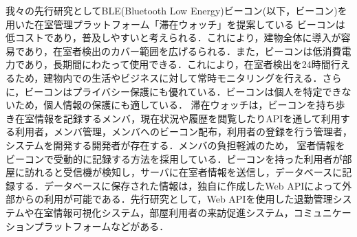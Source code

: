 我々の先行研究としてBLE(Bluetooth Low Energy)ビーコン(以下，ビーコン)を用いた在室管理プラットフォーム「滞在ウォッチ」を提案している
ビーコンは低コストであり，普及しやすいと考えられる．これにより，建物全体に導入が容易であり，在室者検出のカバー範囲を広げるられる．また，ビーコンは低消費電力であり，長期間にわたって使用できる．これにより，在室者検出を24時間行えるため，建物内での生活やビジネスに対して常時モニタリングを行える．さらに，ビーコンはプライバシー保護にも優れている．ビーコンは個人を特定できないため，個人情報の保護にも適している．
滞在ウォッチは，ビーコンを持ち歩き在室情報を記録するメンバ，現在状況や履歴を閲覧したりAPIを通して利用する利用者，メンバ管理，メンバへのビーコン配布，利用者の登録を行う管理者，システムを開発する開発者が存在する．メンバの負担軽減のため，
室者情報をビーコンで受動的に記録する方法を採用している．ビーコンを持った利用者が部屋に訪れると受信機が検知し，サーバに在室者情報を送信し，データベースに記録する．データベースに保存された情報は，独自に作成したWeb APIによって外部からの利用が可能である．先行研究として，Web APIを使用した退勤管理システムや在室情報可視化システム，部屋利用者の来訪促進システム，コミュニケーションプラットフォームなどがある．


